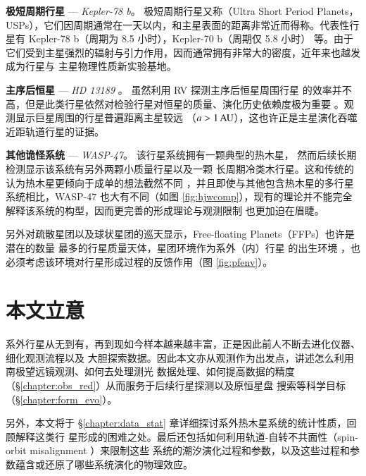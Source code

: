\textbf{极短周期行星} --- \textit{Kepler-78 b}。  {}  极短周期行星又称（Ultra Short Period Planets，
USPs），它们因周期通常在一天以内，和主星表面的距离非常近而得称。代表性行星有 Kepler-78 
b（周期为 8.5 小时\cite{SanchisOjeda2013}），Kepler-70 b（周期仅 5.8 小时\cite{Charpinet2011}）
等。由于它们受到主星强烈的辐射与引力作用，因而通常拥有非常大的密度，近年来也越发成为行星与
主星物理性质新实验基地\cite{Lopez2016,Moutou2016}。

\textbf{主序后恒星} --- \textit{HD 13189}\cite{Hatzes2005} 。 {}  虽然利用 RV 探测主序后恒星周围行星
的效率并不高\cite{Sato2005}，但是此类行星依然对检验行星对恒星的质量、演化历史依赖度极为重要
\cite{Kennedy2008,Johnson2007b,Jones2014}。观测显示巨星周围的行星普遍距离主星较远
（$a > 1\,\mathrm{AU}$），这也许正是主星演化吞噬近距轨道行星的证据\cite{Johnson2007a,Bowler2010}。

\textbf{其他诡怪系统} --- \textit{WASP-47}。 {}  该行星系统拥有一颗典型的热木星\cite{Hellier2012}，
然而后续长期检测显示该系统有另外两颗小质量行星\cite{Becker2015,SanchisOjeda2015}以及一颗
长周期冷类木行星\cite{NeveuVanMalle2016}。这和传统的认为热木星更倾向于成单的想法截然不同
\cite{Steffen2012}，并且即使与其他包含热木星的多行星系统相比，WASP-47 也大有不同（如图 
\ref{fig:hjwcomp}），现有的理论并不能完全解释该系统的构型，因而更完善的形成理论与观测限制
也更加迫在眉睫。

另外对疏散星团以及球状星团的巡天显示，Free-floating Planets（FFPs）也许是潜在的数量
最多的行星质量天体\cite{Lucas2000,Bihain2009,Sumi2011}，星团环境作为系外（内）行星
的出生环境\cite{Adams2010,Liu2013} ，也必须考虑该环境对行星形成过程的反馈作用（图 \ref{fig:pfenv}）。


\section{本文立意}

系外行星从无到有，再到现如今样本越来越丰富，正是因此前人不断去进化仪器、细化观测流程以及
大胆探索数据。因此本文亦从观测作为出发点，讲述怎么利用南极望远镜观测、如何去处理测光
数据处理、如何提高数据的精度（\S \ref{chapter:obs_red}）从而服务于后续行星探测以及原恒星盘
搜索等科学目标（\S \ref{chapter:form_evo}）。

另外，本文将于 \S \ref{chapter:data_stat} 章详细探讨系外热木星系统的统计性质，回顾解释这类行
星形成的困难之处。最后还包括如何利用轨道-自转不共面性（spin-orbit misalignment ）来限制这些
系统的潮汐演化过程和参数，以及这些过程和参数蕴含或还原了哪些系统演化的物理效应。



